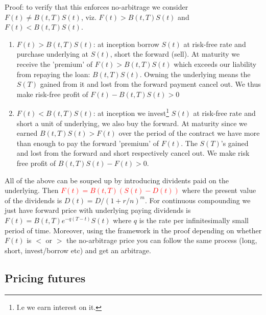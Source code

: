 \documentclass[9pt]{extarticle}
\begin{document}
Proof: to verify that this enforces no-arbitrage we consider $F(t)\neq B(t,T)S(t)$, viz. $F(t)>B(t,T)S(t)$ and $F(t) < B(t,T)S(t)$.
\begin{enumerate}
  \item $F(t)>B(t,T)S(t)$: at inception borrow $S(t)$ at risk-free rate and purchase underlying at $S(t)$, short the forward (sell). At maturity 
  we receive the 'premium' of $F(t)>B(t,T)S(t)$ which exceeds our liability from repaying the loan: $B(t,T)S(t)$. Owning the underlying 
  means the $S(T)$ gained from it and lost from the forward payment cancel out. We thus make risk-free profit of $F(t)-B(t,T)S(t)>0$
  \item $F(t)<B(t,T)S(t)$: at inception we invest\footnote{I.e we earn interest on it.} $S(t)$ at risk-free rate and short a unit of underlying, we also 
  buy the forward. At maturity since we earned $B(t,T)S(t)>F(t)$ over the period of the contract we have more than enough to 
  pay the forward 'premium' of $F(t)$. The $S(T)$'s gained and lost from the forward and short respectively cancel out. We make risk free profit 
  of $B(t,T)S(t)-F(t)>0$. 
\end{enumerate}

All of the above can be souped up by introducing dividents paid on the underlying. Then \textcolor{red}{$F(t)=B(t,T)(S(t)-D(t))$} where 
the present value of the dividends is $D(t)=D/(1+r/n)^m$. For continuous compounding we just have forward price with underlying paying dividends is
$F(t) = B(t,T)e^{-q(T-t)}S(t)$ where $q$ is the rate per infinitesimally small period of time. Moreover, using the 
framework in the proof depending on whether $F(t)$ is $<$ or $>$ the no-arbitrage price you can follow the same process 
(long, short, invest/borrow etc) and get an arbitrage.


\subsection{Pricing futures}
\end{document}
